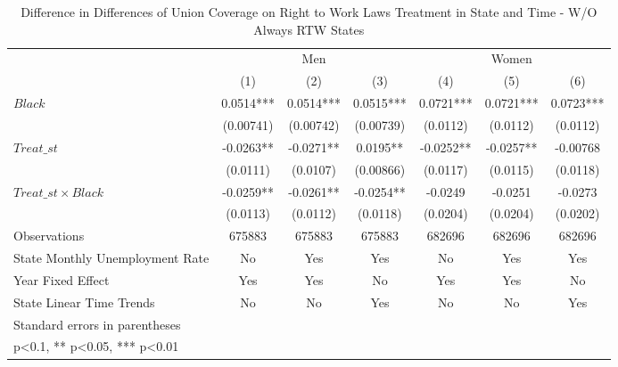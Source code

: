 \begin{table}[htbp]\centering
\def\sym#1{\ifmmode^{#1}\else\(^{#1}\)\fi}
\caption{Difference in Differences of Union Coverage on Right to Work Laws Treatment in State and Time - W/O Always RTW States}
\begin{tabular}{l*{6}{c}}
\hline\hline
                    &\multicolumn{3}{c}{Men}                        &\multicolumn{3}{c}{Women}                      \\\cmidrule(lr){2-4}\cmidrule(lr){5-7}
                    &\multicolumn{1}{c}{(1)}   &\multicolumn{1}{c}{(2)}   &\multicolumn{1}{c}{(3)}   &\multicolumn{1}{c}{(4)}   &\multicolumn{1}{c}{(5)}   &\multicolumn{1}{c}{(6)}   \\
\hline
$ Black $           &      0.0514***&      0.0514***&      0.0515***&      0.0721***&      0.0721***&      0.0723***\\
                    &   (0.00741)   &   (0.00742)   &   (0.00739)   &    (0.0112)   &    (0.0112)   &    (0.0112)   \\
[1em]
$ Treat\_{st} $      &     -0.0263** &     -0.0271** &      0.0195** &     -0.0252** &     -0.0257** &    -0.00768   \\
                    &    (0.0111)   &    (0.0107)   &   (0.00866)   &    (0.0117)   &    (0.0115)   &    (0.0118)   \\
[1em]
$ Treat\_{st} \times Black $&     -0.0259** &     -0.0261** &     -0.0254** &     -0.0249   &     -0.0251   &     -0.0273   \\
                    &    (0.0113)   &    (0.0112)   &    (0.0118)   &    (0.0204)   &    (0.0204)   &    (0.0202)   \\
\hline
Observations        &      675883   &      675883   &      675883   &      682696   &      682696   &      682696   \\
State Monthly Unemployment Rate&          No   &         Yes   &         Yes   &          No   &         Yes   &         Yes   \\
Year Fixed Effect   &         Yes   &         Yes   &          No   &         Yes   &         Yes   &          No   \\
State Linear Time Trends&          No   &          No   &         Yes   &          No   &          No   &         Yes   \\
\hline\hline
\multicolumn{7}{l}{\footnotesize Standard errors in parentheses}\\
\multicolumn{7}{l}{\footnotesize * p<0.1, ** p<0.05, *** p<0.01}\\
\end{tabular}
\end{table}
